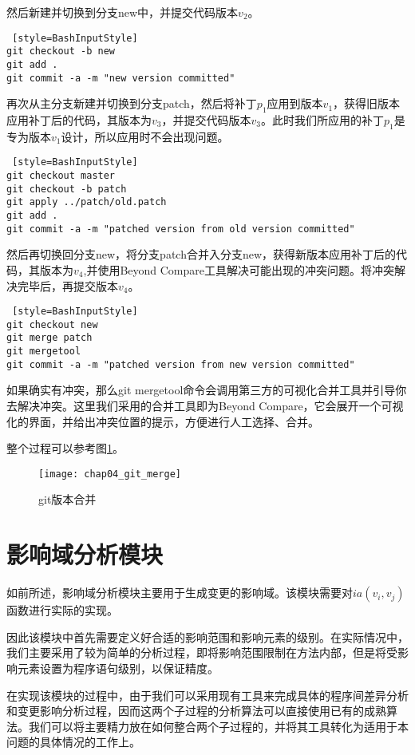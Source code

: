 然后新建并切换到分支new中，并提交代码版本$v_2$。
\begin{lstlisting} [style=BashInputStyle]
git checkout -b new
git add .
git commit -a -m "new version committed"
\end{lstlisting}

再次从主分支新建并切换到分支patch，然后将补丁$p_1$应用到版本$v_1$，获得旧版本应用补丁后的代码，其版本为$v_3$，并提交代码版本$v_3$。此时我们所应用的补丁$p_1$是专为版本$v_1$设计，所以应用时不会出现问题。

\begin{lstlisting} [style=BashInputStyle]
git checkout master
git checkout -b patch
git apply ../patch/old.patch
git add .
git commit -a -m "patched version from old version committed"
\end{lstlisting}

然后再切换回分支new，将分支patch合并入分支new，获得新版本应用补丁后的代码，其版本为$v_4$,并使用Beyond Compare工具解决可能出现的冲突问题。将冲突解决完毕后，再提交版本$v_4$。

\begin{lstlisting} [style=BashInputStyle]
git checkout new
git merge patch
git mergetool
git commit -a -m "patched version from new version committed"
\end{lstlisting}

如果确实有冲突，那么git mergetool命令会调用第三方的可视化合并工具并引导你去解决冲突。这里我们采用的合并工具即为Beyond Compare，它会展开一个可视化的界面，并给出冲突位置的提示，方便进行人工选择、合并。

整个过程可以参考图\ref {git_merge}。

\begin{figure}[H]
	\centering
	\texttt{[image: chap04\_git\_merge]}
	\caption {git版本合并}
	\label {git_merge}	
\end{figure}

\section{影响域分析模块}
\label {tool_impact}

如前所述，影响域分析模块主要用于生成变更的影响域。该模块需要对$ia(v_i,v_j)$函数进行实际的实现。

因此该模块中首先需要定义好合适的影响范围和影响元素的级别。在实际情况中，我们主要采用了较为简单的分析过程，即将影响范围限制在方法内部，但是将受影响元素设置为程序语句级别，以保证精度。

在实现该模块的过程中，由于我们可以采用现有工具来完成具体的程序间差异分析和变更影响分析过程，因而这两个子过程的分析算法可以直接使用已有的成熟算法。我们可以将主要精力放在如何整合两个子过程的，并将其工具转化为适用于本问题的具体情况的工作上。

